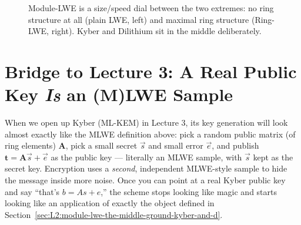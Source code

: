 \begin{figure}[ht]
\centering
{}
\caption{Module-LWE is a size/speed dial between the two extremes: no ring structure at all (plain LWE, left) and maximal ring structure (Ring-LWE, right). Kyber and Dilithium sit in the middle deliberately.}
\label{fig:mlwe-dial}
\end{figure}

\section{Bridge to Lecture 3: A Real Public Key \emph{Is} an (M)LWE Sample}
\label{sec:L2:bridge-to-session-3-a-real-public-key-is}

When we open up Kyber (ML-KEM) in Lecture 3, its key generation will look almost exactly like the MLWE definition above: pick a random public matrix (of ring elements) $\mathbf{A}$, pick a small secret $\vec s$ and small error $\vec e$, and publish $\mathbf{t} = \mathbf{A}\vec s + \vec e$ as the public key --- literally an MLWE sample, with $\vec s$ kept as the secret key. Encryption uses a \emph{second}, independent MLWE-style sample to hide the message inside more noise. Once you can point at a real Kyber public key and say ``that's $b = As+e$,'' the scheme stops looking like magic and starts looking like an application of exactly the object defined in Section~\ref{sec:L2:module-lwe-the-middle-ground-kyber-and-d}.

